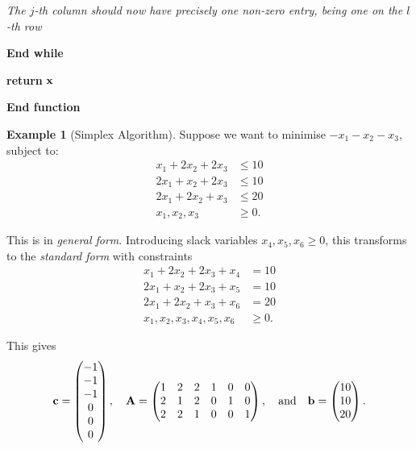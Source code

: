 \documentclass[11pt]{article}
\theoremstyle{definition}
\newtheorem{example}[theorem]{Example}
\theoremstyle{remark}
\newcommand{\pmqty}[1]{\begin{pmatrix}#1\end{pmatrix}}
\newcommand{\qand}{\quad\text{and}\quad}
\newenvironment{algorithmic}{\begin{list}{}{\setlength{\leftmargin}{1em}\setlength{\itemsep}{2pt}}}{\end{list}}
\newcommand{\State}{\item[]}
\newcommand{\Statex}{\item[]}
\newcommand{\EndFunction}{\item[]\textbf{End function}}
\newcommand{\Return}{\textbf{return } }
\newcommand{\EndWhile}{\item[]\textbf{End while}}
\newcommand{\LComment}[1]{\Statex\textit{#1}}
\begin{document}
\begin{algorithm}[ht!]
\begin{algorithmic}
                \LComment{The \(j\)-th column should now have precisely one non-zero entry, being one on the \(l\)-th row}

            \EndWhile

            \Statex

            \State \Return{\(\vb{x}\)}
        \EndFunction
    \end{algorithmic}
\end{algorithm}

\begin{example}[Simplex Algorithm]\label{optim-unit-0054}
    Suppose we want to minimise \(-x_1 - x_2 - x_3\), subject to:
    \begin{align*}
        x_1 + 2 x_2 + 2 x_3 &\leq 10 \\
        2 x_1 + x_2 + 2 x_3 &\leq 10 \\
        2 x_1 + 2 x_2 + x_3 &\leq 20 \\
        x_1, x_2, x_3 &\geq 0.
    \end{align*}

    This is in \emph{general form}. Introducing slack variables \(x_4, x_5, x_6 \geq 0\), this transforms to the \emph{standard form} with constraints
    \begin{align*}
        x_1 + 2 x_2 + 2 x_3 + x_4 &= 10 \\
        2 x_1 + x_2 + 2 x_3 + x_5 &= 10 \\
        2 x_1 + 2 x_2 + x_3 + x_6 &= 20 \\
        x_1, x_2, x_3, x_4, x_5, x_6 &\geq 0.
    \end{align*}

    This gives
    \[
        \vb{c} = \pmqty{-1 \\ -1 \\ -1 \\ 0 \\ 0 \\ 0}, \quad \vb{A} = \pmqty{
            1 & 2 & 2 & 1 & 0 & 0 \\
            2 & 1 & 2 & 0 & 1 & 0 \\
            2 & 2 & 1 & 0 & 0 & 1
        }, \qand \vb{b} = \pmqty{10 \\ 10 \\ 20}.
    \]


\end{example}
\end{document}
